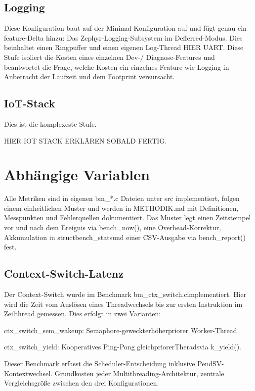 \subsection{Logging}

Diese Konfiguration baut auf der Minimal-Konfiguration auf und fügt genau ein feature-Delta hinzu: Das Zephyr-Logging-Subsystem im Defferred-Modus. Dies beinhaltet einen Ringpuffer und einen eigenen Log-Thread HIER UART. Diese Stufe isoliert die Kosten eines einzelnen Dev-/ Diagnose-Features und beantwortet die Frage, welche Kosten ein einzelnes Feature wie Logging in Anbetracht der Laufzeit und dem Footprint versursacht.

\subsection{IoT-Stack}

Dies ist die komplexeste Stufe.

HIER IOT STACK ERKLÄREN SOBALD FERTIG.

\section{Abhängige Variablen}

Alle Metriken sind in eigenen bm\_*.c Dateien unter src implementiert, folgen einem einheitlichen Muster und werden in METHODIK.md mit Definitionen, Messpunkten und Fehlerquellen dokumentiert. Das Muster legt einen Zeitstempel vor und nach dem Ereignis via bench\_now(), eine Overhead-Korrektur, Akkumulation in structbench\_statsund einer CSV-Ausgabe via bench\_report() fest.

\subsection{Context-Switch-Latenz}

Der Context-Switch wurde im Benchmark bm\_ctx\_switch.cimplementiert. Hier wird die Zeit vom Auslösen eines Threadwechsels bis zur ersten Instruktion im Zeilthread gemessen. Dies erfolgt in zwei Varianten:

ctx\_switch\_sem\_wakeup: Semaphore-geweckterhöherpriorer Worker-Thread

ctx\_switch\_yield: Kooperatives Ping-Pong gleichpriorerTheradsvia k\_yield().

Dieser Benchmark erfasst die Scheduler-Entscheidung inklusive PendSV-Kontextwechsel.  Grundkosten jeder Multithreading-Architektur, zentrale Vergleichsgröße zwischen den drei Konfigurationen.

